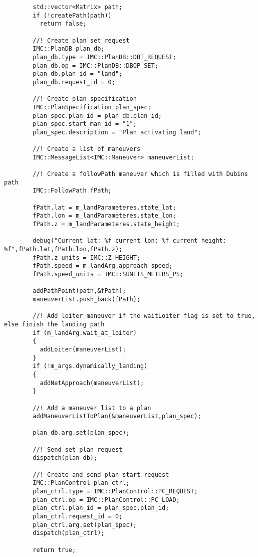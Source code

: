 \begin{frame}[fragile]
\begin{lstlisting}
        std::vector<Matrix> path;
        if (!createPath(path))
          return false;

        //! Create plan set request
        IMC::PlanDB plan_db;
        plan_db.type = IMC::PlanDB::DBT_REQUEST;
        plan_db.op = IMC::PlanDB::DBOP_SET;
        plan_db.plan_id = "land";
        plan_db.request_id = 0;

        //! Create plan specification
        IMC::PlanSpecification plan_spec;
        plan_spec.plan_id = plan_db.plan_id;
        plan_spec.start_man_id = "1";
        plan_spec.description = "Plan activating land";

        //! Create a list of maneuvers
        IMC::MessageList<IMC::Maneuver> maneuverList;

        //! Create a followPath maneuver which is filled with Dubins path
        IMC::FollowPath fPath;

        fPath.lat = m_landParameteres.state_lat;
        fPath.lon = m_landParameteres.state_lon;
        fPath.z = m_landParameteres.state_height;

        debug("Current lat: %f current lon: %f current height: %f",fPath.lat,fPath.lon,fPath.z);
        fPath.z_units = IMC::Z_HEIGHT;
        fPath.speed = m_landArg.approach_speed;
        fPath.speed_units = IMC::SUNITS_METERS_PS;

        addPathPoint(path,&fPath);
        maneuverList.push_back(fPath);

        //! Add loiter maneuver if the waitLoiter flag is set to true, else finish the landing path
        if (m_landArg.wait_at_loiter)
        {
          addLoiter(maneuverList);
        }
        if (!m_args.dynamically_landing)
        {
          addNetApproach(maneuverList);
        }

        //! Add a maneuver list to a plan
        addManeuverListToPlan(&maneuverList,plan_spec);

        plan_db.arg.set(plan_spec);

        //! Send set plan request
        dispatch(plan_db);

        //! Create and send plan start request
        IMC::PlanControl plan_ctrl;
        plan_ctrl.type = IMC::PlanControl::PC_REQUEST;
        plan_ctrl.op = IMC::PlanControl::PC_LOAD;
        plan_ctrl.plan_id = plan_spec.plan_id;
        plan_ctrl.request_id = 0;
        plan_ctrl.arg.set(plan_spec);
        dispatch(plan_ctrl);

        return true;


\end{lstlisting}
\end{frame}
